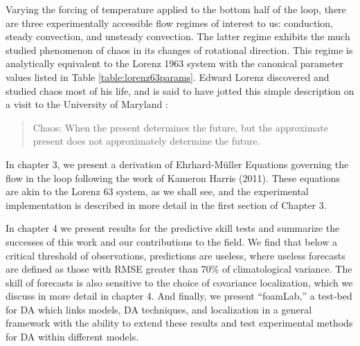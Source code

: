Varying the forcing of temperature applied to the bottom half of the loop, there are three experimentally accessible flow regimes of interest to us: conduction, steady convection, and unsteady convection.
The latter regime exhibits the much studied phenomenon of chaos in its changes of rotational direction.
This regime is analytically equivalent to the Lorenz 1963 system with the canonical parameter values listed in Table \ref{table:lorenz63params}.
Edward Lorenz discovered and studied chaos most of his life, and is said to have jotted this simple description on a visit to the University of Maryland \cite{danforth2013blog}:
\begin{quote}
Chaos: When the present determines the future, but the approximate present does not approximately determine the future.
\end{quote}

In chapter 3, we present a derivation of Ehrhard-M\"{u}ller Equations governing the flow in the loop following the work of Kameron Harris (2011).
These equations are akin to the Lorenz 63 system, as we shall see, and the experimental implementation is described in more detail in the first section of Chapter 3.

In chapter 4 we present results for the predictive skill tests and summarize the successes of this work and our contributions to the field.
We find that below a critical threshold of observations, predictions are useless, where useless forecasts are defined as those with RMSE greater than 70\% of climatological variance.
The skill of forecasts is also sensitive to the choice of covariance localization, which we discuss in more detail in chapter 4.
And finally, we present ``foamLab,'' a test-bed for DA which links models, DA techniques, and localization in a general framework with the ability to extend these results and test experimental methods for DA within different models.






